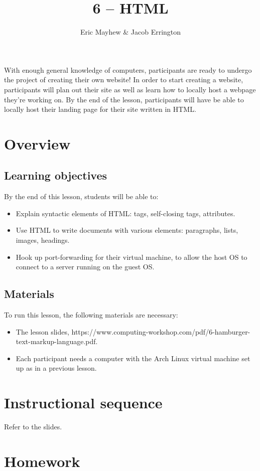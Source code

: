 \documentclass[11pt]{article}
\title{6 -- HTML}
\author{Eric Mayhew \& Jacob Errington}
\date{}
\newcommand{\cwurl}{https://www.computing-workshop.com/}
\newcommand{\cwpdf}{\cwurl pdf/}
\begin{document}
\maketitle

With enough general knowledge of computers, participants are ready to undergo
the project of creating their own website! In order to start creating a website,
participants will plan out their site as well as learn how to locally host a
webpage they're working on. By the end of the lesson, participants will have be
able to locally host their landing page for their site written in HTML.

\section*{Overview}

\subsection*{Learning objectives}

By the end of this lesson, students will be able to:
%
\begin{itemize}
\item Explain syntactic elements of HTML: tags, self-closing tags, attributes.
\item Use HTML to write documents with various elements: paragraphs, lists,
  images, headings.
\item Hook up port-forwarding for their virtual machine, to allow the host OS to
  connect to a server running on the guest OS.
\end{itemize}

\subsection*{Materials}

To run this lesson, the following materials are necessary:

\begin{itemize}
\item The lesson slides, \cwpdf{6-hamburger-text-markup-language.pdf}.
\item Each participant needs a computer with the Arch Linux virtual machine
  set up as in a previous lesson.
\end{itemize}

\section*{Instructional sequence}

Refer to the slides.

\section*{Homework}
\end{document}
